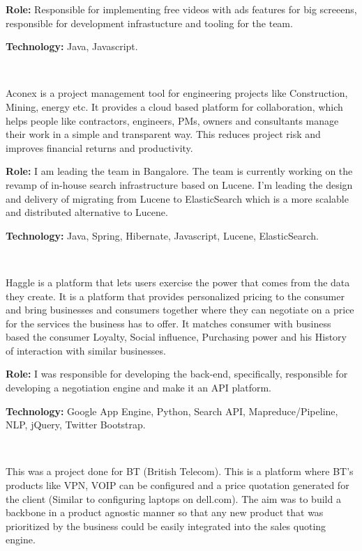 \begin{resume}
\begin{position}
{\textbf{Role:}} Responsible for implementing free videos with ads features for big screeens, responsible for development infrastucture and tooling for the team. 

{\textbf{Technology:}} Java, Javascript.
\end{position}\\

\begin{position}
Aconex is a project management tool for engineering projects like Construction, Mining, energy etc. It provides a cloud based platform for collaboration, which helps people like contractors, engineers, PMs, owners and consultants manage their work in a simple and transparent way. This reduces project risk and improves financial returns and productivity.

{\textbf{Role:}} I am leading the team in Bangalore. The team is currently working on the revamp of in-house search infrastructure based on Lucene. I'm leading the design and delivery of migrating from Lucene to ElasticSearch which is a more scalable and distributed alternative to Lucene. 

{\textbf{Technology:}} Java, Spring, Hibernate, Javascript, Lucene, ElasticSearch.
\end{position}\\

\begin{position}
Haggle is a platform that lets users exercise the power that comes from the data they create. It is a platform that provides personalized pricing to the consumer and bring businesses and consumers together where they can negotiate on a price for the services the business has to offer. It matches consumer with business based the consumer Loyalty, Social influence, Purchasing power and his History of interaction with similar businesses.

{\textbf{Role:}} I was responsible for developing the back-end, specifically, responsible for developing a negotiation engine and make it an API platform.

{\textbf{Technology:}} Google App Engine, Python, Search API, Mapreduce/Pipeline, NLP, jQuery, Twitter Bootstrap. 
\end{position}\\

\begin{position}
This was a project done for  BT (British Telecom). This is a platform where BT's products like VPN, VOIP can be configured and a price quotation generated for the client (Similar to configuring laptops on dell.com). The aim was to build a backbone in
a product agnostic manner so that any new product that was prioritized by the business could be easily integrated into the sales quoting engine.


\end{position}
\end{resume}
